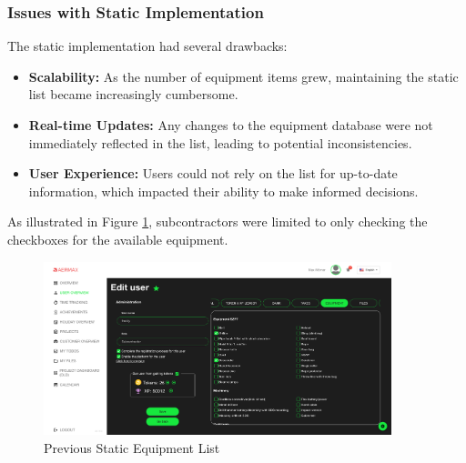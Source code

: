 \subsubsection{Issues with Static Implementation}
The static implementation had several drawbacks:
\begin{itemize}
    \item \textbf{Scalability:} As the number of equipment items grew, maintaining the static list became increasingly cumbersome.
    \item \textbf{Real-time Updates:} Any changes to the equipment database were not immediately reflected in the list, leading to potential inconsistencies.
    \item \textbf{User Experience:} Users could not rely on the list for up-to-date information, which impacted their ability to make informed decisions.
\end{itemize}

As illustrated in Figure \ref{fig:static_equipment_list}, subcontractors were limited to only checking the checkboxes for the available equipment.

\begin{figure}[H]
    \centering
    \includegraphics[width=0.9\textwidth]{src/assets/chapters/StaticDynamicEquipementList.png}
    \caption{Previous Static Equipment List}
    \label{fig:static_equipment_list}
\end{figure}

